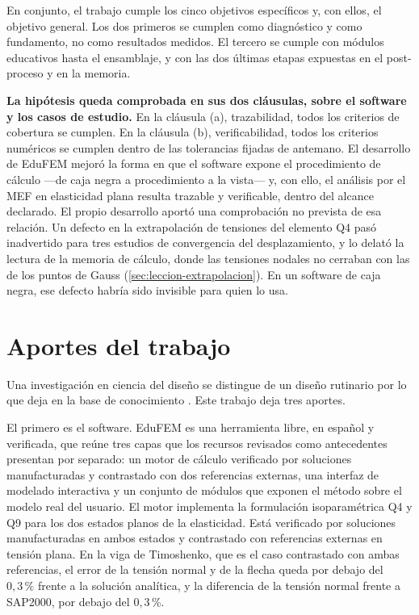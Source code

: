 En conjunto, el trabajo cumple los cinco objetivos específicos y, con ellos, el objetivo general. Los dos primeros se cumplen como diagnóstico y como fundamento, no como resultados medidos. El tercero se cumple con módulos educativos hasta el ensamblaje, y con las dos últimas etapas expuestas en el post-proceso y en la memoria.

\textbf{La hipótesis queda comprobada en sus dos cláusulas, sobre el software y los casos de estudio.} En la cláusula (a), trazabilidad, todos los criterios de cobertura se cumplen. En la cláusula (b), verificabilidad, todos los criterios numéricos se cumplen dentro de las tolerancias fijadas de antemano. El desarrollo de EduFEM mejoró la forma en que el software expone el procedimiento de cálculo —de caja negra a procedimiento a la vista— y, con ello, el análisis por el MEF en elasticidad plana resulta trazable y verificable, dentro del alcance declarado. El propio desarrollo aportó una comprobación no prevista de esa relación. Un defecto en la extrapolación de tensiones del elemento Q4 pasó inadvertido para tres estudios de convergencia del desplazamiento, y lo delató la lectura de la memoria de cálculo, donde las tensiones nodales no cerraban con las de los puntos de Gauss (\autoref{sec:leccion-extrapolacion}). En un software de caja negra, ese defecto habría sido invisible para quien lo usa.

\section*{Aportes del trabajo}

Una investigación en ciencia del diseño se distingue de un diseño rutinario por lo que deja en la base de conocimiento \autocite[p.~81]{hevner2004design}. Este trabajo deja tres aportes.

El primero es el software. EduFEM es una herramienta libre, en español y verificada, que reúne tres capas que los recursos revisados como antecedentes presentan por separado: un motor de cálculo verificado por soluciones manufacturadas y contrastado con dos referencias externas, una interfaz de modelado interactiva y un conjunto de módulos que exponen el método sobre el modelo real del usuario. El motor implementa la formulación isoparamétrica Q4 y Q9 para los dos estados planos de la elasticidad. Está verificado por soluciones manufacturadas en ambos estados y contrastado con referencias externas en tensión plana. En la viga de Timoshenko, que es el caso contrastado con ambas referencias, el error de la tensión normal y de la flecha queda por debajo del $0{,}3\,\%$ frente a la solución analítica, y la diferencia de la tensión normal frente a SAP2000, por debajo del $0{,}3\,\%$.

